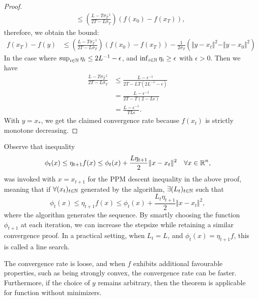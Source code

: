 \documentclass[12pt]{article}
\begin{document}
\begin{proof}
\begin{align*}
                &\le 
                \left(
                    \frac{L- T\sigma_T^{-1}}{2T - L\sigma_T}
                \right)
                (f(x_0) - f(x_T)), 
            \end{align*}
            therefore, we obtain the bound: 
            \begin{align*}
                f(x_T) - f(y) &\le 
                \left(
                    \frac{L- T\sigma_T^{-1}}{2T - L\sigma_T}
                \right)
                (f(x_0) - f(x_T))
                - 
                \frac{1}{2\sigma_T}(\Vert y - x_t\Vert^2 - \Vert y - x_0\Vert^2)
            \end{align*}
            In the case where $\sup_{i\in \mathbb N} \eta_i \le 2L^{-1} - \epsilon$, and $\inf_{i\in \mathbb N}\eta_i \ge \epsilon$ with $\epsilon > 0$. 
            Then we have 
            \begin{align*}
                \frac{L -T\sigma_T^{-1}}{2T - L\sigma_T}
                &\le 
                \frac{L - \epsilon^{-1}}{2T - LT(2L^{-1} - \epsilon)}
                \\
                &= 
                \frac{L - \epsilon^{-1}}{2T - T(2 - L\epsilon)}
                \\
                &= 
                \frac{L - \epsilon^{-1}}{TL\epsilon}. 
            \end{align*}
            With $y = x_*$, we get the claimed convergence rate because $f(x_t)$ is strictly monotone decreasing. 
        \end{proof}
        \begin{remark}
            Observe that inequality 
            $$
                \phi_t(x) \le \eta_{t + 1}f(x) \le \phi_t(x) 
                + 
                \frac{L\eta_{t + 1}}{2}\Vert x - x_t\Vert^2 \quad \forall x \in \mathbb R^n, 
            $$
            was invoked with $x = x_{t + 1}$ for the PPM descent inequality in the above proof, meaning that if  $\forall (x_t)_{t \in \mathbb N}$ generated by the algorithm, $\exists (L_t)_{t \in \mathbb N}$ such that
            $$
                \phi_t(x) \le \eta_{t + 1}f(x) \le \phi_t(x) 
                + 
                \frac{L_t\eta_{t + 1}}{2}\Vert x - x_t\Vert^2,
            $$
            where the algorithm generates the sequence. 
            By smartly choosing the function $\phi_{t + 1}$ at each iteration, we can increase the stepsize while retaining a similar convergence proof. 
            In a practical setting, when $L_t = L$, and $\phi_{t}(x) = \eta_{t + 1}f$, this is called a line search.
            \par\noindent
            The convergence rate is loose, and when $f$ exhibits additional favourable properties, such as being strongly convex, the convergence rate can be faster. 
            Furthermore, if the choice of $y$ remains arbitrary, then the theorem is applicable for function without minimizers. 
        \end{remark}
\end{document}
